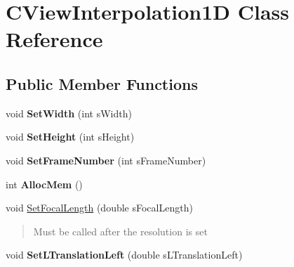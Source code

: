 \hypertarget{class_c_view_interpolation1_d}{}\section{C\+View\+Interpolation1D Class Reference}
\label{class_c_view_interpolation1_d}
\subsection*{Public Member Functions}
\begin{DoxyCompactItemize}
\item 
\mbox{\label{class_c_view_interpolation1_d_aa7163a463ac9369bacd25aba379e3758}} 
void {\bfseries Set\+Width} (int s\+Width)
\item 
\mbox{\label{class_c_view_interpolation1_d_ad5bb01ad9612bb6dd7ec2711ec1e9db5}} 
void {\bfseries Set\+Height} (int s\+Height)
\item 
\mbox{\label{class_c_view_interpolation1_d_a5529b4f237804b7e56b4cc75d047c3f9}} 
void {\bfseries Set\+Frame\+Number} (int s\+Frame\+Number)
\item 
\mbox{\label{class_c_view_interpolation1_d_acbc97e4dd17538467a44d1bc00b053a8}} 
int {\bfseries Alloc\+Mem} ()
\item 
\mbox{\label{class_c_view_interpolation1_d_ae28899179aa95ce333d0484fdd3ab6d9}} 
void \hyperlink{class_c_view_interpolation1_d_ae28899179aa95ce333d0484fdd3ab6d9}{Set\+Focal\+Length} (double s\+Focal\+Length)
\begin{DoxyCompactList}\small\item\em \begin{quote}
Must be called after the resolution is set \end{quote}
\end{DoxyCompactList}\item 
\mbox{\label{class_c_view_interpolation1_d_af23b0594b5ff5b91286216ff1277623c}} 
void {\bfseries Set\+L\+Translation\+Left} (double s\+L\+Translation\+Left)
\item 
\mbox{\label{class_c_view_interpolation1_d_ad0394bebe842409fab63fff38b7a8af5}} 

\end{DoxyCompactItemize}
